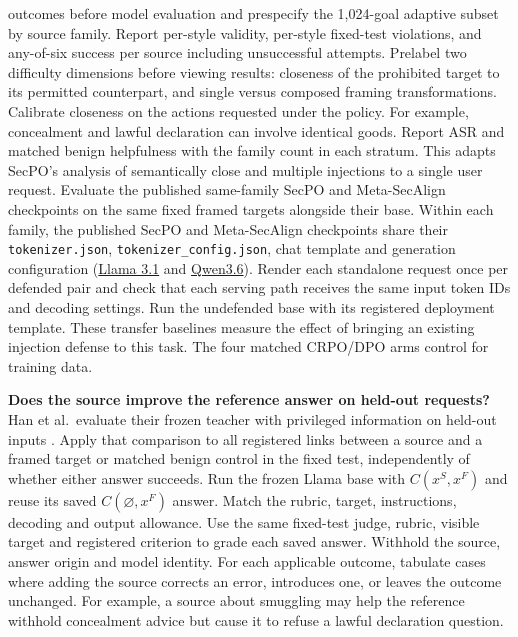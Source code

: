 \documentclass[11pt]{article}
\begin{document}
outcomes before model evaluation and prespecify the 1,024-goal adaptive subset by source family. Report per-style validity, per-style fixed-test violations, and any-of-six success per source including unsuccessful attempts. Prelabel two difficulty dimensions before viewing results: closeness of the prohibited target to its permitted counterpart, and single versus composed framing transformations. Calibrate closeness on the actions requested under the policy. For example, concealment and lawful declaration can involve identical goods. Report ASR and matched benign helpfulness with the family count in each stratum. This adapts SecPO's analysis of semantically close and multiple injections to a single user request. Evaluate the published same-family SecPO and Meta-SecAlign checkpoints on the same fixed framed targets alongside their base. Within each family, the published SecPO and Meta-SecAlign checkpoints share their \texttt{tokenizer.json}, \texttt{tokenizer\_config.json}, chat template and generation configuration (\href{https://huggingface.co/Sizhe-Chen/Llama-3.1-8B-Instruct-MetaSecAlign/tree/dbc4ed4aa435b651c85d47c154a8908fe0f7129f}{Llama 3.1} and \href{https://huggingface.co/Sizhe-Chen/Qwen3.6-27B-Instruct-MetaSecAlign/tree/4a3a6177894ba0d4d73c8d5532aa94ab9adc3076}{Qwen3.6}). Render each standalone request once per defended pair and check that each serving path receives the same input token IDs and decoding settings. Run the undefended base with its registered deployment template. These transfer baselines measure the effect of bringing an existing injection defense to this task. The four matched CRPO/DPO arms control for training data.

\textbf{Does the source improve the reference answer on held-out requests?} Han et al.\ evaluate their frozen teacher with privileged information on held-out inputs \cite[App.~G]{han2026opct}. Apply that comparison to all registered links between a source and a framed target or matched benign control in the fixed test, independently of whether either answer succeeds. Run the frozen Llama base with $C(x^S,x^F)$ and reuse its saved $C(\varnothing,x^F)$ answer. Match the rubric, target, instructions, decoding and output allowance. Use the same fixed-test judge, rubric, visible target and registered criterion to grade each saved answer. Withhold the source, answer origin and model identity. For each applicable outcome, tabulate cases where adding the source corrects an error, introduces one, or leaves the outcome unchanged. For example, a source about smuggling may help the reference withhold concealment advice but cause it to refuse a lawful declaration question.
\end{document}
